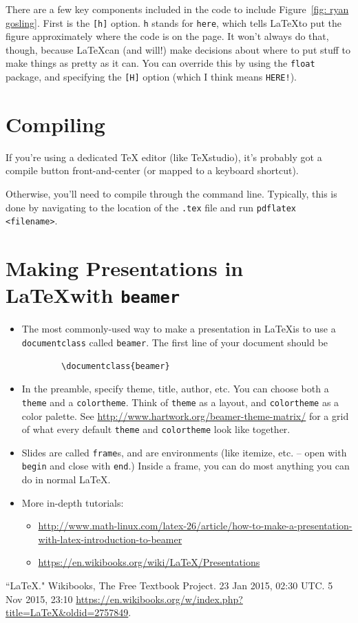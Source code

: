 \documentclass[12pt]{article}
\begin{document}
	There are a few key components included in the code to include Figure~\ref{fig: ryan gosling}. First is the \verb|[h]| option. \texttt{h} stands for \texttt{here}, which tells \LaTeX to put the figure approximately where the code is on the page. It won't always do that, though, because \LaTeX can (and will!) make decisions about where to put stuff to make things as pretty as it can. You can override this by using the \texttt{float} package, and specifying the \verb|[H]| option (which I think means \texttt{HERE!}).
	
	\section{Compiling}
	If you're using a dedicated TeX editor (like TeXstudio), it's probably got a compile button front-and-center (or mapped to a keyboard shortcut). 
	
	Otherwise, you'll need to compile through the command line. Typically, this is done by navigating to the location of the \texttt{.tex} file and run \texttt{pdflatex <filename>}.
	
	\section{Making Presentations in \LaTeX with \texttt{beamer}}
	\begin{itemize}
		\item The most commonly-used way to make a presentation in \LaTeX is to use a \texttt{documentclass} called \texttt{beamer}. The first line of your document should be
		\begin{verbatim}
		\documentclass{beamer}
		\end{verbatim}
		\item In the preamble, specify theme, title, author, etc. You can choose both a \texttt{theme} and a \texttt{colortheme}. Think of \texttt{theme} as a layout, and \texttt{colortheme} as a color palette. See \url{http://www.hartwork.org/beamer-theme-matrix/} for a grid of what every default \texttt{theme} and \texttt{colortheme} look like together.
		\item Slides are called \texttt{frame}s, and are environments (like itemize, etc. -- open with \texttt{begin} and close with \texttt{end}.) Inside a frame, you can do most anything you can do in normal \LaTeX.
		\item More in-depth tutorials:
		\begin{itemize}
			\item \url{http://www.math-linux.com/latex-26/article/how-to-make-a-presentation-with-latex-introduction-to-beamer}
			\item \url{https://en.wikibooks.org/wiki/LaTeX/Presentations}
		\end{itemize}
	\end{itemize}
	
	\begin{thebibliography}{99} %
		 ``LaTeX." Wikibooks, The Free Textbook Project. 23 Jan 2015, 02:30 UTC. 5 Nov 2015, 23:10 \url{https://en.wikibooks.org/w/index.php?title=LaTeX&oldid=2757849}.
	\end{thebibliography}
	
\end{document}
